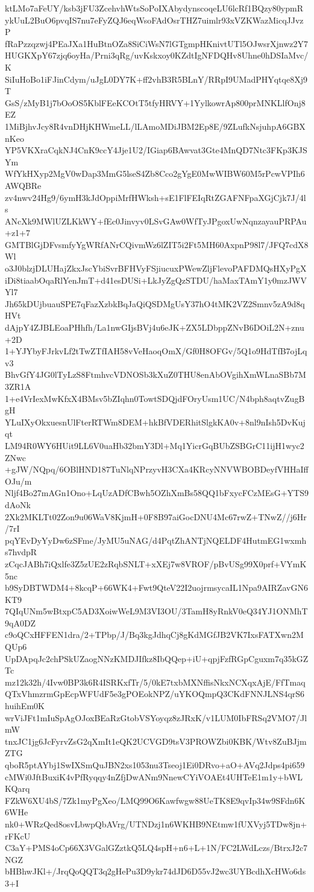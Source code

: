 ktLMo7aFeUY/ksb3jFU3ZcehvhWtsSoPoIXAbydynscoqeLU6lcRf1BQzy80ypmR
ykUuL2BuO6pvqIS7nu7eFyZQJ6eqWsoFAdOsrTHZ7uimlr93xVZKWazMicqJJvzP
fRaPzzqzwj4PEaJXa1HuBtnOZa8SiCiWsN7lGTgmpHKnivtUTl5OJwsrXjnwz2Y7
HUGKXpY67zjq6oyHa/Prni3qRg/uvKskxoy0KZdtIgNFDQHv8Uhne0hDSIaMvc/K
SiIuHoBo1iFJinCdym/uJgL0DY7K+ff2vhB3R5BLnY/RRpI9UMadPHYqtqe8Xj9T
GsS/zMyB1j7bOoOS5KblFEeKCOtT5tfyHRVY+1YylkowrAp800prMNKLlfOnj8EZ
1MiBjhvJcy8R4vnDHjKHWmeLL/lLAmoMDiJBM2Ep8E/9ZLufkNsjuhpA6GBXnKeo
YP5VKXraCqkNJ4CnK9ccY4Jje1U2/IGiap6BAwvat3Gte4MnQD7Ntc3FKp3KJSYm
WfYkHXyp2MgV0wDap3MmG5lseS4Zb8Cco2gYgE0MwWIBW60M5rPcwVPIh6AWQBRe
zv4nwv24Hg9/6ymH3kJdOppiMrfHWksh+sE1FlFEIqRtZGAFNFpaXGjCjk7J/4ls
ANcXk9MWlUZLKkWY+fEc0Jinvyv0LSvGAw0WfTyJPgoxUwNqnzayauPRPAu+z1+7
GMTBlGjDFvsmfyYgWRfANrCQivmWz6lZIT5i2Ft5MH60AxpnP98l7/JFQ7cdX8Wl
o3J0blzjDLUHajZkxJscYbiSvrBFHVyFSjiucuxPWewZljFlevoPAFDMQsHXyPgX
iDi8tiaabOqaRlYenJmT+d41esDUSi+LkJyZgQzSTDU/haMaxTAmY1y0mzJWVYl7
Jh65kDUjbuauSPE7qFazXzbkBqJaQiQSDMgUsY37hO4tMK2VZ2Smnv5zA9d8qHVt
dAjpY4ZJBLEoaPHhfh/La1nwGIjsBVj4u6eJK+ZX5LDbppZNvB6DOiL2N+znu+2D
1+YJYbyFJrkvLf2tTwZTfIAH58vVeHaoqOmX/Gf0H8OFGv/5Q1o9HdTfB7ojLqv3
BhvGfY4JG0lTyLzS8FtmhvcVDNOSb3kXuZ0THU8enAbOVgihXmWLnaSBb7M3ZR1A
1+e4VrIexMwKfxX4BMsv5bZIqhn0TowtSDQjdFOryUsm1UC/N4bph8aqtvZugBgH
YLuIXyOkxuesnUlFterRTWm8DEM+hkBfVDERhitSlgkKA0v+8nl9nIsh5DvKujqt
LM94R0WY6HUit9LL6V0uaHb32bmY3Dl+Mq1YicrGqBUbZSBGrC11ijH1wyc2ZNwc
+gJW/NQpq/6OBlHND187TuNlqNPrzyvH3CXa4KRcyNNVWBOBDeyfVHHaIffOJu/m
Nljf4Bo27mAGn1Ono+LqUzADfCBwh5OZhXmBs58QQ1bFxycFCzMEsG+YTS9dAoNk
2Xk2MKLTt02Zon9u06WaV8KjmH+0F8B97aiGocDNU4Mc67rwZ+TNwZ//j6Hr/7rI
pqYEvDyYyDw6zSFme/JyMU5uNAG/d4PqtZhANTjNQELDF4HutmEG1wxmhs7hvdpR
zCqcJABh7iQxlfe3Z5zUE2zRqbSNLT+xXEj7w8VROF/pBvUSg99X0prf+VYmK5nc
b9SyDBTWDM4+8kcqP+66WK4+Fwt9QteV22I2uojrmsycaIL1Npa9AIRZavGN6KT9
7QIqUNm5wBtxpC5AD3XoiwWeL9M3VI3OU/3TamH8yRnkV0eQ34YJ1ONMhT9qA0DZ
c9oQCxHFFEN1dra/2+TPbp/J/Bq3kgJdhqCj8gKdMGfJB2VK7IxsFATXwn2MQUp6
UpDApqJc2chPSkUZaogNNzKMDJIfkz8IbQQep+iU+qpjFzfRGpCguxm7q35kGZTc
mz12k32h/4Ivw0BP3k6R4ISRKxfTr/5/0kE7txbMXNffisNkxNCXqxAjE/FfTmaq
QTxVhmzrmGpEcpWFUdF5e3gPOEokNPZ/uYKOQmpQ3CKdFNNJLNS4qrS6huihEm0K
wrViJFt1mIuSpAgOJoxBEaRzGtobVSYoyqz8zJRxK/v1LUM0IbFRSq2VMO7/JlmW
tnxJC1jg6JcFyrvZsG2qXmIt1eQK2UCVGD9tsV3PROWZbi0KBK/Wtv8ZuBJjmZTG
qboR5ptAYbj1SwIXSmQuJBN2xs1053nu3Tseoj1Ei0DRvo+aO+AVq2Jdps4pi659
cMWi0JftBuxiK4vPfRyqqy4nZfjDwANm9NnewCYiVOAEt4UHTeE1m1y+bWLKQarq
FZkW6XU4bS/7Zk1myPgXeo/LMQ99O6Kawfwgw88UeTK8E9qvIp34w9SFdn6K6WHe
nk0+WRzQed8osvLbwpQbAVrg/UTNDzj1n6WKHB9NEtmw1fUXVyj5TDw8jn+rFKcU
C3aY+PMS4oCp66X3VGalGZztkQ5LQ4spH+n6+L+1N/FC2LWdLczs/BtrxJ2c7NGZ
bHBhwJKl+/JrqQoQQT3q2gHePu3D9ykr74dJD6D55vJ2wc3UYBcdhXcHWo6ds3+I
